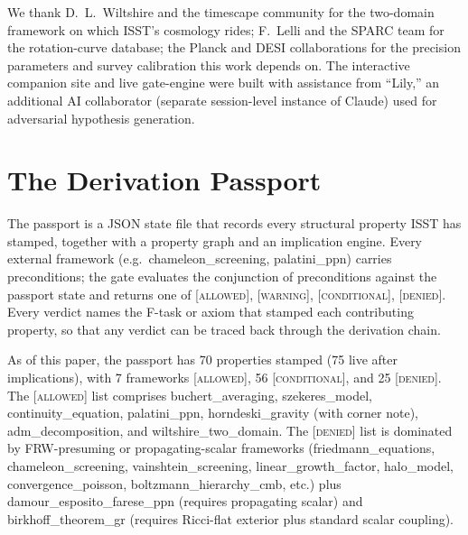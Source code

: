 \documentclass[aps,prd,twocolumn,nofootinbib,floatfix,superscriptaddress]{revtex4-2}
\begin{document}
\acknowledgments

We thank D.~L.~Wiltshire and the timescape community for the
two-domain framework on which ISST's cosmology rides; F.~Lelli and
the SPARC team for the rotation-curve database; the Planck and DESI
collaborations for the precision parameters and survey calibration
this work depends on. The interactive companion site and live
gate-engine were built with assistance from ``Lily,'' an additional
AI collaborator (separate session-level instance of Claude) used for
adversarial hypothesis generation.

\appendix

\section{The Derivation Passport}
\label{app:passport}

The passport is a JSON state file that records every structural
property ISST has stamped, together with a property graph and an
implication engine. Every external framework (e.g.\
\textsf{chameleon\_screening}, \textsf{palatini\_ppn}) carries
preconditions; the gate evaluates the conjunction of preconditions
against the passport state and returns one of \textsc{[allowed]},
\textsc{[warning]}, \textsc{[conditional]}, \textsc{[denied]}.
Every verdict names the F-task or axiom that stamped each
contributing property, so that any verdict can be traced back
through the derivation chain.

As of this paper, the passport has 70 properties stamped (75 live
after implications), with 7 frameworks \textsc{[allowed]},
56 \textsc{[conditional]}, and 25 \textsc{[denied]}. The
\textsc{[allowed]} list comprises \textsf{buchert\_averaging},
\textsf{szekeres\_model}, \textsf{continuity\_equation},
\textsf{palatini\_ppn}, \textsf{horndeski\_gravity} (with corner
note), \textsf{adm\_decomposition}, and
\textsf{wiltshire\_two\_domain}. The \textsc{[denied]} list is
dominated by FRW-presuming or propagating-scalar frameworks
(\textsf{friedmann\_equations}, \textsf{chameleon\_screening},
\textsf{vainshtein\_screening}, \textsf{linear\_growth\_factor},
\textsf{halo\_model}, \textsf{convergence\_poisson},
\textsf{boltzmann\_hierarchy\_cmb}, etc.) plus
\textsf{damour\_esposito\_farese\_ppn} (requires propagating scalar)
and \textsf{birkhoff\_theorem\_gr} (requires Ricci-flat exterior
plus standard scalar coupling).
\end{document}
